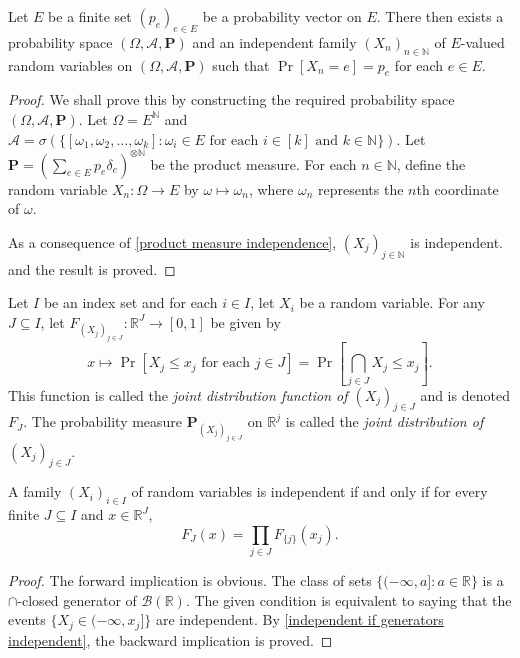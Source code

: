 \begin{theorem}
    Let $E$ be a finite set $(p_e)_{e\in E}$ be a probability vector on $E$. There then exists a probability space $(\Omega,\mathcal{A},\textbf{P})$ and an independent family $(X_n)_{n\in\mathbb{N}}$ of $E$-valued random variables on $(\Omega,\mathcal{A},\textbf{P})$ such that $\Pr[X_n = e] = p_e$ for each $e\in E$.
\end{theorem}
\begin{proof}
    We shall prove this by constructing the required probability space $(\Omega,\mathcal{A},\textbf{P})$. Let $\Omega=E^\mathbb{N}$ and $\mathcal{A}=\sigma\left(\{[\omega_1,\omega_2,\ldots,\omega_k]:\omega_i\in E\text{ for each }i\in[k]\text{ and }k\in\mathbb{N}\}\right)$. Let $\textbf{P}=\left(\sum_{e\in E}p_e\delta_e\right)^{\otimes\mathbb{N}}$ be the product measure. For each $n\in\mathbb{N}$, define the random variable $X_n:\Omega\to E$ by $\omega\mapsto \omega_n$, where $\omega_n$ represents the $n$th coordinate of $\omega$.
    
    As a consequence of \ref{product measure independence}, $(X_j)_{j\in\mathbb{N}}$ is independent. and the result is proved.
\end{proof}

\begin{definition}
    Let $I$ be an index set and for each $i\in I$, let $X_i$ be a random variable. For any $J\subseteq I$, let $F_{(X_j)_{j\in J}}:\mathbb{R}^J\to[0,1]$ be given by
    $$x\mapsto \Pr[X_j\leq x_j\text{ for each }j\in J]=\Pr\left[\bigcap_{j\in J} X_j\leq x_j\right].$$
    This function is called the \textit{joint distribution function of $(X_j)_{j\in J}$} and is denoted $F_J$. The probability measure $\textbf{P}_{(X_j)_{j\in J}}$ on $\mathbb{R}^j$ is called the \textit{joint distribution of $(X_j)_{j\in J}$}.
\end{definition}

\begin{theorem}
    A family $(X_i)_{i\in I}$ of random variables is independent if and only if for every finite $J\subseteq I$ and $x\in\mathbb{R}^J$,
    $$F_J(x) = \prod_{j\in J}F_{\{j\}}(x_j).$$
\end{theorem}
\begin{proof}
    The forward implication is obvious. The class of sets $\{(-\infty,a]:a\in\mathbb{R}\}$ is a $\cap$-closed generator of $\mathcal{B}(\mathbb{R})$. The given condition is equivalent to saying that the events $\{X_j\in(-\infty,x_j]\}$ are independent. By \ref{independent if generators independent}, the backward implication is proved.
\end{proof}

